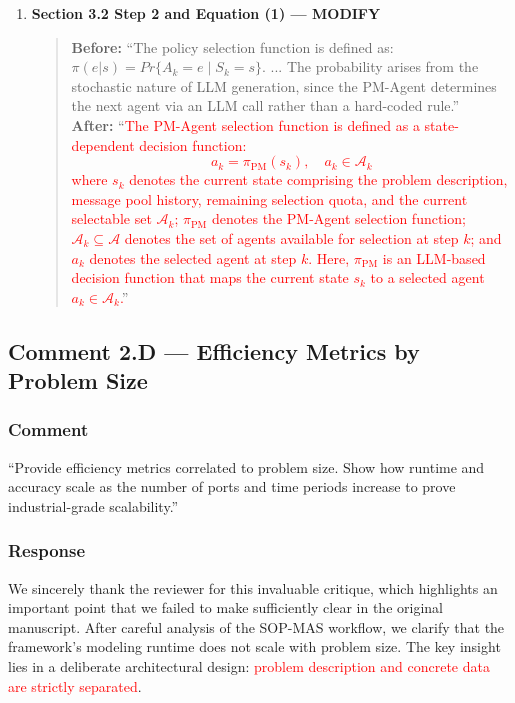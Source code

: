 \documentclass[11pt,a4paper]{article}
\begin{document}
\begin{enumerate}
\item \textbf{Section 3.2 Step 2 and Equation (1) --- MODIFY}
\begin{quote}
\textbf{Before:} ``The policy selection function is defined as: $\pi(e|s)=Pr\{A_k=e \mid S_k=s\}$. ... The probability arises from the stochastic nature of LLM generation, since the PM-Agent determines the next agent via an LLM call rather than a hard-coded rule.''\\[4pt]
\textbf{After:} ``\textcolor{red}{The PM-Agent selection function is defined as a state-dependent decision function:
\begin{equation}\label{eq:pm-selection-revised}
a_k=\pi_{\mathrm{PM}}\left(s_k\right), \quad a_k\in\mathcal{A}_k
\end{equation}
where $s_k$ denotes the current state comprising the problem description, message pool history, remaining selection quota, and the current selectable set $\mathcal{A}_k$; $\pi_{\mathrm{PM}}$ denotes the PM-Agent selection function; $\mathcal{A}_k \subseteq \mathcal{A}$ denotes the set of agents available for selection at step $k$; and $a_k$ denotes the selected agent at step $k$. Here, $\pi_{\mathrm{PM}}$ is an LLM-based decision function that maps the current state $s_k$ to a selected agent $a_k \in \mathcal{A}_k$.}''
\end{quote}
\end{enumerate}

\subsection{Comment 2.D --- Efficiency Metrics by Problem Size}

\subsubsection{Comment}
``Provide efficiency metrics correlated to problem size. Show how runtime and accuracy scale as the number of ports and time periods increase to prove industrial-grade scalability.''

\subsubsection{Response}
We sincerely thank the reviewer for this invaluable critique, which highlights an important point that we failed to make sufficiently clear in the original manuscript. After careful analysis of the SOP-MAS workflow, we clarify that the framework's modeling runtime does not scale with problem size. The key insight lies in a deliberate architectural design: \textcolor{red}{problem description and concrete data are strictly separated}.
\end{document}
